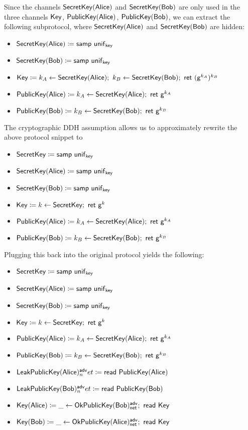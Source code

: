 \noindent Since the channels $\mathsf{SecretKey}(\mathsf{Alice})$ and $\mathsf{SecretKey}(\mathsf{Bob})$ are only used in the three channels $\mathsf{Key}$, $\mathsf{PublicKey}(\mathsf{Alice})$, $\mathsf{PublicKey}(\mathsf{Bob})$, we can extract the following subprotocol, where $\mathsf{SecretKey}(\mathsf{Alice})$ and $\mathsf{SecretKey}(\mathsf{Bob})$ are hidden:

\begin{itemize}
\item $\mathsf{SecretKey}(\mathsf{Alice}) \coloneqq \mathsf{samp} \ \mathsf{unif}_{\mathsf{key}}$
\item $\mathsf{SecretKey}(\mathsf{Bob}) \coloneqq \mathsf{samp} \ \mathsf{unif}_{\mathsf{key}}$
\item $\Key \coloneqq k_A \leftarrow \SecretKey(\Alice); \ k_B \leftarrow \SecretKey(\Bob); \ \ret{(\gen^{k_A})^{k_B}}$
\item $\mathsf{PublicKey}(\mathsf{Alice}) \coloneqq k_A \leftarrow \mathsf{SecretKey}(\mathsf{Alice}); \ \mathsf{ret} \ \mathsf{g}^{k_A}$
\item $\mathsf{PublicKey}(\mathsf{Bob}) \coloneqq k_B \leftarrow \mathsf{SecretKey}(\mathsf{Bob}); \ \mathsf{ret} \ \mathsf{g}^{k_B}$
\end{itemize}

\noindent The cryptographic DDH assumption allows us to approximately rewrite the above protocol snippet to

\begin{itemize}
\item $\mathsf{SecretKey} \coloneqq \mathsf{samp} \ \mathsf{unif}_{\mathsf{key}}$
\item $\mathsf{SecretKey}(\mathsf{Alice}) \coloneqq \mathsf{samp} \ \mathsf{unif}_{\mathsf{key}}$
\item $\mathsf{SecretKey}(\mathsf{Bob}) \coloneqq \mathsf{samp} \ \mathsf{unif}_{\mathsf{key}}$
\item $\mathsf{Key} \coloneqq k \leftarrow \mathsf{SecretKey}; \ \mathsf{ret} \ \mathsf{g}^k$
\item $\mathsf{PublicKey}(\mathsf{Alice}) \coloneqq k_A \leftarrow \mathsf{SecretKey}(\mathsf{Alice}); \ \mathsf{ret} \ \mathsf{g}^{k_A}$
\item $\mathsf{PublicKey}(\mathsf{Bob}) \coloneqq k_B \leftarrow \mathsf{SecretKey}(\mathsf{Bob}); \ \mathsf{ret} \ \mathsf{g}^{k_B}$
\end{itemize}

\noindent Plugging this back into the original protocol yields the following:

\begin{itemize}
\item $\mathsf{SecretKey} \coloneqq \mathsf{samp} \ \mathsf{unif}_{\mathsf{key}}$
\item $\mathsf{SecretKey}(\mathsf{Alice}) \coloneqq \mathsf{samp} \ \mathsf{unif}_{\mathsf{key}}$
\item $\mathsf{SecretKey}(\mathsf{Bob}) \coloneqq \mathsf{samp} \ \mathsf{unif}_{\mathsf{key}}$
\item $\mathsf{Key} \coloneqq k \leftarrow \mathsf{SecretKey}; \ \mathsf{ret} \ \mathsf{g}^k$
\item $\mathsf{PublicKey}(\mathsf{Alice}) \coloneqq k_A \leftarrow \mathsf{SecretKey}(\mathsf{Alice}); \ \mathsf{ret} \ \mathsf{g}^{k_A}$
\item $\mathsf{PublicKey}(\mathsf{Bob}) \coloneqq k_B \leftarrow \mathsf{SecretKey}(\mathsf{Bob}); \ \mathsf{ret} \ \mathsf{g}^{k_B}$
\item $\mathsf{LeakPublicKey}(\mathsf{Alice})^{\mathsf{adv}}_net \coloneqq \mathsf{read} \ \mathsf{PublicKey}(\mathsf{Alice})$
\item $\mathsf{LeakPublicKey}(\mathsf{Bob})^{\mathsf{adv}}_net \coloneqq \mathsf{read} \ \mathsf{PublicKey}(\mathsf{Bob})$
\item $\mathsf{Key}(\mathsf{Alice}) \coloneqq \_ \leftarrow \mathsf{OkPublicKey}(\mathsf{Bob})^{\mathsf{adv}}_{\mathsf{net}}; \ \mathsf{read} \ \mathsf{Key}$
\item $\mathsf{Key}(\mathsf{Bob}) \coloneqq \_ \leftarrow \mathsf{OkPublicKey}(\mathsf{Alice})^{\mathsf{adv}}_{\mathsf{net}}; \ \mathsf{read} \ \mathsf{Key}$
\end{itemize}

